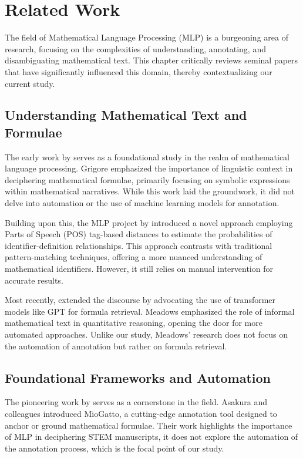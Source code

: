 \chapter{Related Work}\label{chapter:related_work}

The field of Mathematical Language Processing (MLP) is a burgeoning area of research, focusing on the complexities of understanding, annotating, and disambiguating mathematical text. This chapter critically reviews seminal papers that have significantly influenced this domain, thereby contextualizing our current study.

\section{Understanding Mathematical Text and Formulae}

The early work by \citet{grigore2009towards} serves as a foundational study in the realm of mathematical language processing. Grigore emphasized the importance of linguistic context in deciphering mathematical formulae, primarily focusing on symbolic expressions within mathematical narratives. While this work laid the groundwork, it did not delve into automation or the use of machine learning models for annotation.

Building upon this, the MLP project by \citet{pagael2014mathematical} introduced a novel approach employing Parts of Speech (POS) tag-based distances to estimate the probabilities of identifier-definition relationships. This approach contrasts with traditional pattern-matching techniques, offering a more nuanced understanding of mathematical identifiers. However, it still relies on manual intervention for accurate results.

Most recently, \citet{meadows2022survey} extended the discourse by advocating the use of transformer models like GPT for formula retrieval. Meadows emphasized the role of informal mathematical text in quantitative reasoning, opening the door for more automated approaches. Unlike our study, Meadows' research does not focus on the automation of annotation but rather on formula retrieval.

\section{Foundational Frameworks and Automation}

The pioneering work by \citet{asakura2020towards} serves as a cornerstone in the field. Asakura and colleagues introduced MioGatto, a cutting-edge annotation tool designed to anchor or ground mathematical formulae. Their work highlights the importance of MLP in deciphering STEM manuscripts, it does not explore the automation of the annotation process, which is the focal point of our study.

